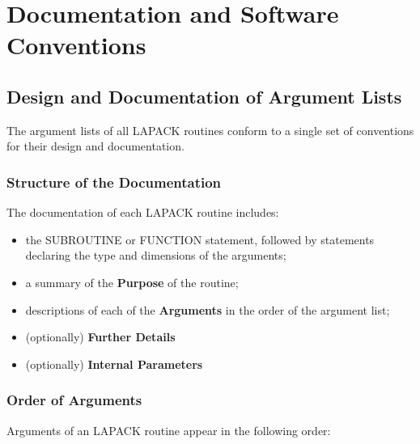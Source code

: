 \chapter{Documentation and Software Conventions}\label{chapdocsoftware}

\section{Design and Documentation of Argument Lists}\label{secdesdoc}

The argument lists of all LAPACK routines conform to a single
set of conventions for their design and documentation. 

\subsection{Structure of the Documentation}\label{subsecstructdoc}

The documentation  of each LAPACK 
routine includes:

\begin{itemize}

\item the SUBROUTINE or FUNCTION statement, followed by statements
declaring the type and dimensions of the arguments;

\item a summary of the {\bf Purpose} of the routine;

\item descriptions of each of the {\bf Arguments} in the order of
the argument list;

\item (optionally) {\bf Further Details}

\item (optionally) {\bf Internal Parameters}

\end{itemize}

\subsection{Order of Arguments}\label{subsecargorder}
 
Arguments of an LAPACK routine appear 
in the following order:

